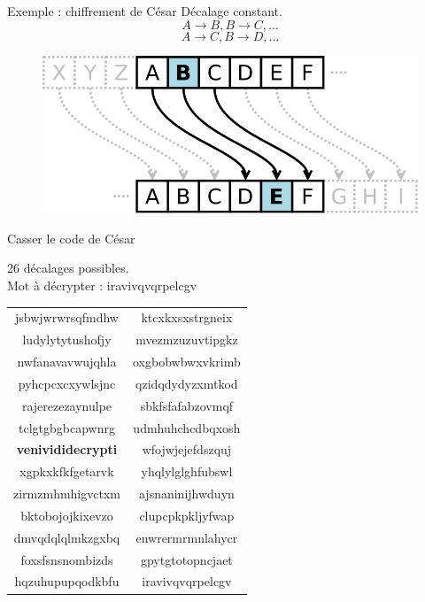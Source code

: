 \documentclass{beamer}
\begin{document}
\begin{frame}{Exemple : chiffrement de César}
  Décalage constant. 
$$A\rightarrow B, B\rightarrow C, \text{...}$$ 
$$A\rightarrow C, B\rightarrow D, \text{...}$$

  \begin{figure}
    \centering
  \includegraphics[scale = 0.25]{cesar.png}
\end{figure}
\end{frame}


\begin{frame}{Casser le code de César}
\begin{block}{}
  26 décalages possibles.\\
  Mot à décrypter :  iravivqvqrpelcgv 
\end{block}
  

\footnotesize
\begin{tabular}{c c}
jsbwjwrwrsqfmdhw &  
ktcxkxsxstrgneix\\
ludylytytushofjy &  
mvezmzuzuvtipgkz\\
nwfanavavwujqhla &   
oxgbobwbwxvkrimb\\
pyhcpcxcxywlsjnc & 
qzidqdydyzxmtkod\\
rajerezezaynulpe &
sbkfsfafabzovmqf\\
tclgtgbgbcapwnrg &
udmhuhchcdbqxosh\\
\textbf{\textcolor{red!60!black}{venivididecrypti}} &
wfojwjejefdszquj\\
xgpkxkfkfgetarvk &
yhqlylglghfubswl\\
zirmzmhmhigvctxm &
ajsnaninijhwduyn\\
bktobojojkixevzo &
clupcpkpkljyfwap\\
dmvqdqlqlmkzgxbq &
enwrermrmnlahycr\\
foxsfsnsnombizds &
gpytgtotopncjaet\\
hqzuhupupqodkbfu &
iravivqvqrpelcgv\\
\end{tabular}
\normalsize
  \end{frame}
\end{document}

